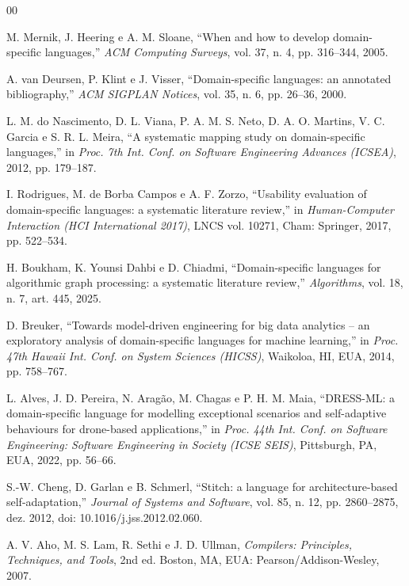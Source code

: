 \documentclass[conference]{IEEEtran}
\begin{document}
\begin{thebibliography}{00}

 M. Mernik, J. Heering e A. M. Sloane, ``When and how to
develop domain-specific languages,'' \textit{ACM Computing Surveys}, vol. 37,
n. 4, pp. 316--344, 2005.

 A. van Deursen, P. Klint e J. Visser, ``Domain-specific
languages: an annotated bibliography,'' \textit{ACM SIGPLAN Notices}, vol. 35,
n. 6, pp. 26--36, 2000.

 L. M. do Nascimento, D. L. Viana, P. A. M. S. Neto,
D. A. O. Martins, V. C. Garcia e S. R. L. Meira, ``A systematic mapping study on
domain-specific languages,'' in \textit{Proc. 7th Int. Conf. on Software
Engineering Advances (ICSEA)}, 2012, pp. 179--187.

 I. Rodrigues, M. de Borba Campos e A. F. Zorzo,
``Usability evaluation of domain-specific languages: a systematic literature
review,'' in \textit{Human-Computer Interaction (HCI International 2017)}, LNCS
vol. 10271, Cham: Springer, 2017, pp. 522--534.

 H. Boukham, K. Younsi Dahbi e D. Chiadmi,
``Domain-specific languages for algorithmic graph processing: a systematic
literature review,'' \textit{Algorithms}, vol. 18, n. 7, art. 445, 2025.

 D. Breuker, ``Towards model-driven engineering for big data
analytics -- an exploratory analysis of domain-specific languages for machine
learning,'' in \textit{Proc. 47th Hawaii Int. Conf. on System Sciences (HICSS)},
Waikoloa, HI, EUA, 2014, pp. 758--767.

 L. Alves, J. D. Pereira, N. Aragão, M. Chagas e P. H. M.
Maia, ``DRESS-ML: a domain-specific language for modelling exceptional scenarios
and self-adaptive behaviours for drone-based applications,'' in \textit{Proc.
44th Int. Conf. on Software Engineering: Software Engineering in Society (ICSE
SEIS)}, Pittsburgh, PA, EUA, 2022, pp. 56--66.

 S.-W. Cheng, D. Garlan e B. Schmerl, ``Stitch: a language for
architecture-based self-adaptation,'' \textit{Journal of Systems and Software},
vol. 85, n. 12, pp. 2860--2875, dez. 2012, doi: 10.1016/j.jss.2012.02.060.

 A. V. Aho, M. S. Lam, R. Sethi e J. D. Ullman,
\textit{Compilers: Principles, Techniques, and Tools}, 2nd ed. Boston, MA, EUA:
Pearson/Addison-Wesley, 2007.


\end{thebibliography}
\end{document}
